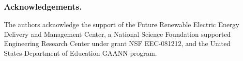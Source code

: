 \documentclass{llncs}
\begin{document}
\subsubsection*{Acknowledgements.} The authors acknowledge the support of the Future Renewable
Electric Energy Delivery and Management Center,
a National Science Foundation supported Engineering Research
Center under grant NSF EEC-081212, and the United States Department of Education GAANN program.



\end{document}
